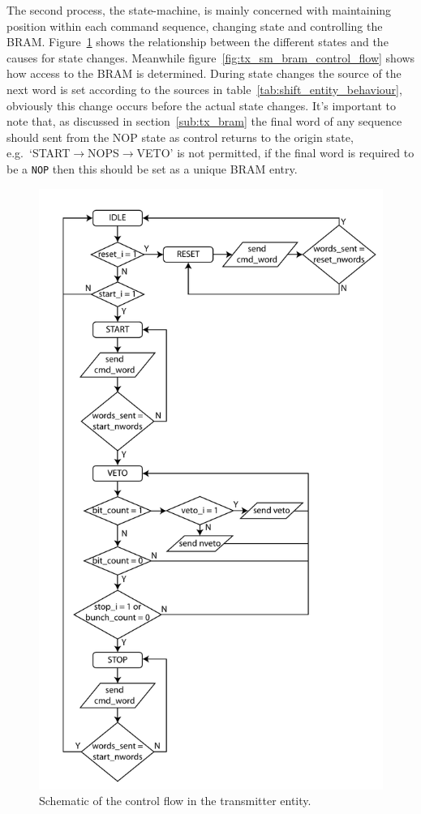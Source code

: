 The second process, the state-machine, is mainly concerned with maintaining position within each command sequence, changing state and controlling the BRAM. Figure~\ref{fig:tx_sm_flow} shows the relationship between the different states and the causes for state changes. Meanwhile figure~\ref{fig:tx_sm_bram_control_flow} shows how access to the BRAM is determined. During state changes the source of the next word is set according to the sources in table~\ref{tab:shift_entity_behaviour}, obviously this change occurs before the actual state changes. It's important to note that, as discussed in section~\ref{sub:tx_bram} the final word of any sequence should sent from the NOP state as control returns to the origin state, e.g.\ `START\( \rightarrow \)NOPS\( \rightarrow \)VETO' is not permitted, if the final word is required to be a \texttt{NOP} then this should be set as a unique BRAM entry. 
    
\begin{figure}[htbp]
  \centering
  \includegraphics[height=0.8\textheight]{images/pdfs/tx_sm_flow.pdf}
  \caption{Schematic of the control flow in the transmitter entity.}
  \label{fig:tx_sm_flow}
\end{figure}
  
